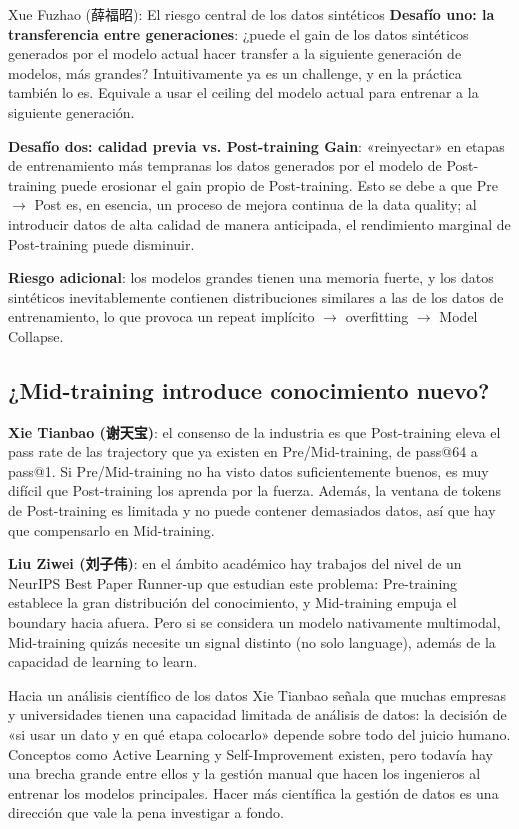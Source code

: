 \begin{warningbox}{Xue Fuzhao (薛福昭): El riesgo central de los datos sintéticos}
\textbf{Desafío uno: la transferencia entre generaciones}: ¿puede el gain de los datos sintéticos generados por el modelo actual hacer transfer a la siguiente generación de modelos, más grandes? Intuitivamente ya es un challenge, y en la práctica también lo es. Equivale a usar el ceiling del modelo actual para entrenar a la siguiente generación.

\textbf{Desafío dos: calidad previa vs. Post-training Gain}: «reinyectar» en etapas de entrenamiento más tempranas los datos generados por el modelo de Post-training puede erosionar el gain propio de Post-training. Esto se debe a que Pre $\to$ Post es, en esencia, un proceso de mejora continua de la data quality; al introducir datos de alta calidad de manera anticipada, el rendimiento marginal de Post-training puede disminuir.

\textbf{Riesgo adicional}: los modelos grandes tienen una memoria fuerte, y los datos sintéticos inevitablemente contienen distribuciones similares a las de los datos de entrenamiento, lo que provoca un repeat implícito $\to$ overfitting $\to$ Model Collapse.
\end{warningbox}

\subsection{¿Mid-training introduce conocimiento nuevo?}

\textbf{Xie Tianbao (谢天宝)}: el consenso de la industria es que Post-training eleva el pass rate de las trajectory que ya existen en Pre/Mid-training, de pass@64 a pass@1. Si Pre/Mid-training no ha visto datos suficientemente buenos, es muy difícil que Post-training los aprenda por la fuerza. Además, la ventana de tokens de Post-training es limitada y no puede contener demasiados datos, así que hay que compensarlo en Mid-training.

\textbf{Liu Ziwei (刘子伟)}: en el ámbito académico hay trabajos del nivel de un NeurIPS Best Paper Runner-up que estudian este problema: Pre-training establece la gran distribución del conocimiento, y Mid-training empuja el boundary hacia afuera. Pero si se considera un modelo nativamente multimodal, Mid-training quizás necesite un signal distinto (no solo language), además de la capacidad de learning to learn.

\begin{knowledgebox}{Hacia un análisis científico de los datos}
Xie Tianbao señala que muchas empresas y universidades tienen una capacidad limitada de análisis de datos: la decisión de «si usar un dato y en qué etapa colocarlo» depende sobre todo del juicio humano. Conceptos como Active Learning y Self-Improvement existen, pero todavía hay una brecha grande entre ellos y la gestión manual que hacen los ingenieros al entrenar los modelos principales. Hacer más científica la gestión de datos es una dirección que vale la pena investigar a fondo.
\end{knowledgebox}

